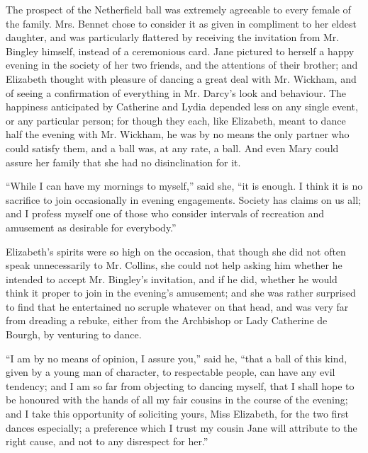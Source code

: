 \documentclass[10pt]{book}
\begin{document}
   The prospect of the Netherfield ball was extremely agreeable to every
female of the family. Mrs. Bennet chose to consider it as given in
compliment to her eldest daughter, and was particularly flattered by
receiving the invitation from Mr. Bingley himself, instead of a
ceremonious card. Jane pictured to herself a happy evening in the
society of her two friends, and the attentions of their brother; and
Elizabeth thought with pleasure of dancing a great deal with Mr.
Wickham, and of seeing a confirmation of everything in Mr. Darcy’s look
and behaviour. The happiness anticipated by Catherine and Lydia depended
less on any single event, or any particular person; for though they
each, like Elizabeth, meant to dance half the evening with Mr. Wickham,
he was by no means the only partner who
   could satisfy them, and a ball
was, at any rate, a ball. And even Mary could assure her family that she
had no disinclination for it.
  

   “While I can have my mornings to myself,” said she, “it is enough. I
think it is no sacrifice to join occasionally in evening engagements.
Society has claims on us all; and I profess myself one of those who
consider intervals of recreation and amusement as desirable for
everybody.”
  

   Elizabeth’s spirits were so high on the occasion, that though she did
not often speak unnecessarily to Mr. Collins, she could not help asking
him whether he intended to accept Mr. Bingley’s invitation, and if he
did, whether he would think it proper to join in the evening’s
amusement; and she was rather surprised to find that he entertained no
scruple whatever on that head, and was very far from dreading a rebuke,
either from the Archbishop or Lady Catherine de Bourgh, by venturing to
dance.
  

   “I am by no means of opinion, I assure you,” said he, “that a ball of
this kind, given by a young man of character, to respectable people, can
have any evil tendency; and I am so far from objecting to dancing
myself, that I shall hope to be honoured with the hands of all my fair
cousins in the course of the evening; and I take this opportunity of
soliciting yours, Miss Elizabeth, for the two first dances especially; a
preference which I trust my cousin Jane will attribute to the right
cause, and not to any disrespect for her.”
  
\end{document}

